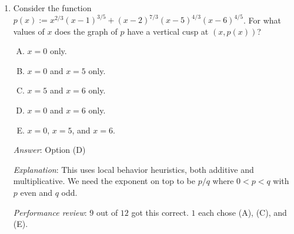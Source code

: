 \documentclass[10pt]{amsart}
\begin{document}
\begin{enumerate}
  {\em Answer}: Option (E).

  {\em Explanation}: Consider $g(x) := x^{1/3}$. This has a vertical
  tangent at $c = 0$. If we choose $f(x) = x$, we get (A). If we
  choose $f(x) = x^2$, we get (B). If we choose $f(x) = x^3$, we get
  neither a vertical tangent nor a vertical cusp. Hence, (E) is the
  only viable option.

  {\em Performance review}: $7$ out of $12$ got this correct. $4$
  chose (C), $1$ chose (D).

  {\em Historical note (last year)}: $5$ out of $14$ people got this
  correct. Other choices were (A) (3), (C) (4), (B) (1),and (D) (1).

  {\em Historical note}: In an earlier quiz where this question
  appeared, $3$ out of $15$ people got this correct. Other choices were
  (A) (7), (C) (4), and (D) (1). The main thing that people had
  trouble with was thinking of possibilities for $f$ that could play
  the role of converting the vertical tangent behavior of the original
  function $g$ into vertical cusp or ``neither'' behavior for the
  composite function.

  {\em Action point}: Performance this time was a little better than
  earlier, but it seems that many of you either did not read the
  original solution or it did not register properly in your
  minds. Well, there's always a second chance! Take it this time.

\item Consider the function $p(x) := x^{2/3}(x - 1)^{3/5} +
  (x-2)^{7/3}(x - 5)^{4/3}(x - 6)^{4/5}$. For what values of $x$ does
  the graph of $p$ have a vertical cusp at $(x,p(x))$?

  \begin{enumerate}[(A)]
  \item $x = 0$ only.
  \item $x = 0$ and $x = 5$ only.
  \item $x = 5$ and $x = 6$ only.
  \item $x = 0$ and $x = 6$ only.
  \item $x = 0$, $x = 5$, and $x = 6$.
  \end{enumerate}

  {\em Answer}: Option (D)

  {\em Explanation}: This uses local behavior heuristics, both
  additive and multiplicative. We need the exponent on top to be $p/q$
  where $0 < p < q$ with $p$ even and $q$ odd.

  {\em Performance review}: $9$ out of $12$ got this correct. $1$ each
  chose (A), (C), and (E).


\end{enumerate}
\end{document}
